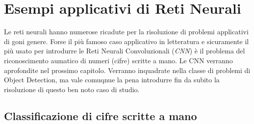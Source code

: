\documentclass[12pt,a4paper,openright,twoside]{report}
\begin{document}
\section{Esempi applicativi di Reti Neurali}
Le reti neurali hanno numerose ricadute per la risoluzione di problemi applicativi di goni genere.
Forse il più famoso caso applicativo in letteratura e sicuramente il più usato per introdurre le Reti Neurali Convoluzionali (\emph{CNN}) è il problema del riconoscimento aumatico di numeri (cifre) scritte a mano. 
Le CNN verranno aprofondite nel prossimo capitolo. Verranno inquadrate nella classe di problemi di Object Detection, ma vale comuqnue la pena introdurre fin da subito la risoluzione di questo ben noto caso di studio. 
\subsection{Classificazione di cifre scritte a mano}
\end{document}

